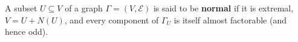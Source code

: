 A subset $U \subseteq V$ of a graph $\Gamma = (V, \mathcal{E})$ is said to be \textbf{normal} if it is extremal, $V = U + N(U)$, and every component of $\Gamma_U$ is itself almost factorable (and hence odd).
